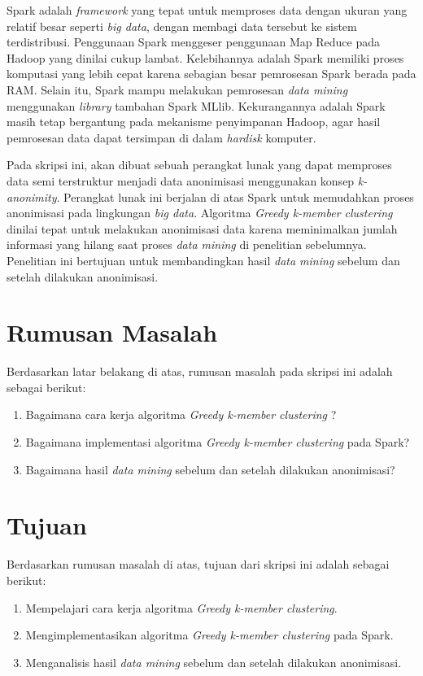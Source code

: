 Spark adalah {\it framework} yang tepat untuk memproses data dengan ukuran yang relatif besar seperti {\it big data}, dengan membagi data tersebut ke sistem terdistribusi. Penggunaan Spark menggeser penggunaan Map Reduce pada Hadoop yang dinilai cukup lambat. Kelebihannya adalah Spark memiliki proses komputasi yang lebih cepat karena sebagian besar pemrosesan Spark berada pada RAM. Selain itu, Spark mampu melakukan pemrosesan {\it data mining} menggunakan {\it library} tambahan Spark MLlib. Kekurangannya adalah Spark masih tetap bergantung pada mekanisme penyimpanan Hadoop, agar hasil pemrosesan data dapat tersimpan di dalam {\it hardisk} komputer.

\newpage
Pada skripsi ini, akan dibuat sebuah perangkat lunak yang dapat memproses data semi terstruktur menjadi data anonimisasi menggunakan konsep {\it k-anonimity}. Perangkat lunak ini berjalan di atas Spark untuk memudahkan proses anonimisasi pada lingkungan {\it big data}. Algoritma {\it Greedy k-member clustering} dinilai tepat untuk melakukan anonimisasi data karena meminimalkan jumlah informasi yang hilang saat proses {\it data mining} di penelitian sebelumnya. Penelitian ini bertujuan untuk membandingkan hasil {\it data mining} sebelum dan setelah dilakukan anonimisasi.

\section{Rumusan Masalah}
\label{sec:rumusan}
Berdasarkan latar belakang di atas, rumusan masalah pada skripsi ini adalah sebagai berikut:
\begin{enumerate}
\item Bagaimana cara kerja algoritma {\it Greedy k-member clustering} ?
\item Bagaimana implementasi algoritma {\it Greedy k-member clustering} pada Spark?
\item Bagaimana hasil {\it data mining} sebelum dan setelah dilakukan anonimisasi?
\end{enumerate}

\section{Tujuan}
\label{sec:tujuan}
Berdasarkan rumusan masalah di atas, tujuan dari skripsi ini adalah sebagai berikut:
\begin{enumerate}
\item Mempelajari cara kerja algoritma {\it Greedy k-member clustering}.
\item Mengimplementasikan algoritma {\it Greedy k-member clustering } pada Spark.
\item Menganalisis hasil {\it data mining} sebelum dan setelah dilakukan anonimisasi.
\end{enumerate}

